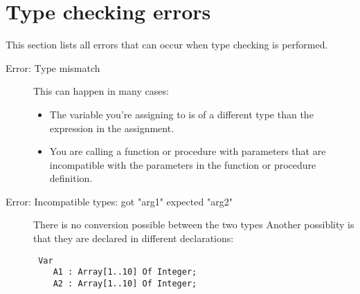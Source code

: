  \section{Type checking errors}
 This section lists all errors that can occur when type checking is
 performed.
 \begin{description}
\item [Error: Type mismatch]
 This can happen in many cases:
 \begin{itemize}
 \item The variable you're assigning to is of a different type than the
 expression in the assignment.
 \item You are calling a function or procedure with parameters that are
 incompatible with the parameters in the function or procedure definition.
 \end{itemize}
\item [Error: Incompatible types: got "arg1" expected "arg2"]
 There is no conversion possible between the two types
 Another possiblity is that they are declared in different
 declarations:
 \begin{verbatim}
 Var
    A1 : Array[1..10] Of Integer;
    A2 : Array[1..10] Of Integer;


\end{verbatim}
\end{description}
